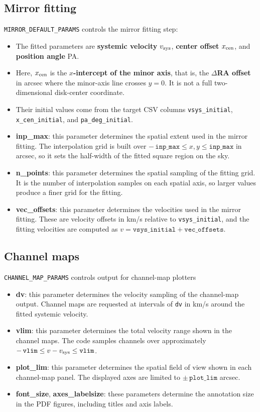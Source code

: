 \documentclass{report}
\begin{document}
\subsection{Mirror fitting}
\texttt{MIRROR\_DEFAULT\_PARAMS} controls the mirror fitting step:
\begin{itemize}
    \item The fitted parameters are \textbf{systemic velocity} $v_{\rm sys}$, \textbf{center offset} $x_{\rm cen}$, and \textbf{position angle} PA.
    \item Here, $x_{\rm cen}$ is the \textbf{$x$-intercept of the minor axis}, that is, the \textbf{$\Delta$RA offset} in arcsec where the minor-axis line crosses $y=0$. It is not a full two-dimensional disk-center coordinate.
    \item Their initial values come from the target CSV columns \texttt{vsys\_initial}, \texttt{x\_cen\_initial}, and \texttt{pa\_deg\_initial}.
    \item \textbf{inp\_max}: this parameter determines the spatial extent used in the mirror fitting. The interpolation grid is built over $-\,\texttt{inp\_max} \le x, y \le \texttt{inp\_max}$ in arcsec, so it sets the half-width of the fitted square region on the sky.
    \item \textbf{n\_points}: this parameter determines the spatial sampling of the fitting grid. It is the number of interpolation samples on each spatial axis, so larger values produce a finer grid for the fitting.
    \item \textbf{vec\_offsets}: this parameter determines the velocities used in the mirror fitting. These are velocity offsets in km/s relative to \texttt{vsys\_initial}, and the fitting velocities are computed as $v = \texttt{vsys\_initial} + \texttt{vec\_offsets}$.
\end{itemize}

\subsection{Channel maps}
\texttt{CHANNEL\_MAP\_PARAMS} controls output for channel-map plotters
\begin{itemize}
    \item \textbf{dv}: this parameter determines the velocity sampling of the channel-map output. Channel maps are requested at intervals of \texttt{dv} in km/s around the fitted systemic velocity.
    \item \textbf{vlim}: this parameter determines the total velocity range shown in the channel maps. The code samples channels over approximately $-\,\texttt{vlim} \le v-v_{\rm sys} \le \texttt{vlim}$.
    \item \textbf{plot\_lim}: this parameter determines the spatial field of view shown in each channel-map panel. The displayed axes are limited to $\pm\,\texttt{plot\_lim}$ arcsec.
    \item \textbf{font\_size}, \textbf{axes\_labelsize}: these parameters determine the annotation size in the PDF figures, including titles and axis labels.
\end{itemize}
\end{document}
